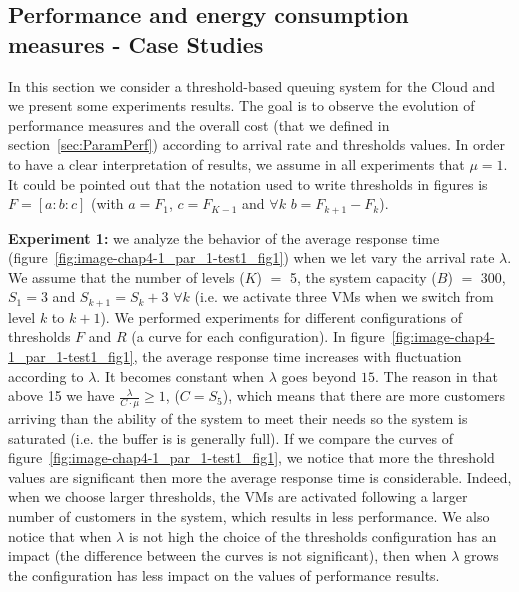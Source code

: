 \documentclass[conference]{IEEEtran}
\begin{document}
\subsection{Performance and energy consumption measures - Case Studies}
\label{BBB}
In this section we consider a threshold-based queuing system for the Cloud and we present some experiments results.
The goal is to observe the evolution of performance measures and the overall cost (that we defined in section~\ref{sec:ParamPerf}) according to arrival
rate and thresholds values. In order to have a clear interpretation of results, we assume in all experiments that $\mu=1$.
It could be pointed out that the notation used to write thresholds in figures is $F=[a:b:c]$
(with $a=F_1$, $c=F_{K-1}$ and $\forall k$ $b=F_{k+1}-F_{k}$).

\textbf{Experiment 1:} we analyze the behavior of the average response time (figure~\ref{fig:image-chap4-1_par_1-test1_fig1})
when we let vary the arrival rate $\lambda$. We assume that the number of levels ($K$) $=$ 5,
the system capacity ($B$) $=$ 300, $S_{1}=3$ and $S_{k+1}=S_{k}+3$ $\forall k$ (i.e. we activate three VMs when we switch from level $k$ to $k+1$). We performed experiments for different configurations of thresholds
$F$ and $R$ (a curve for each configuration). In figure~\ref{fig:image-chap4-1_par_1-test1_fig1}, the average response time increases with fluctuation according
to $\lambda$. It becomes constant when $\lambda$ goes beyond $15$. The reason in that above 15 we have
$\frac{\lambda} {C \cdot \mu} \geq 1$, ($C=S_{5}$), which means that there are more customers arriving than the ability of the system to meet their needs so the system is saturated (i.e. the buffer is is generally full). If we compare the curves of figure~\ref{fig:image-chap4-1_par_1-test1_fig1}, we notice that more the threshold values are significant then more the average response time is considerable.
Indeed, when we choose larger thresholds, the VMs are activated following a larger number of customers in the system, which results in less performance.
We also notice that when $\lambda$ is not high the choice of the thresholds configuration has an impact
(the difference between the curves is not significant), then when $\lambda$ grows the configuration has less impact on the values of performance results.

\end{document}
